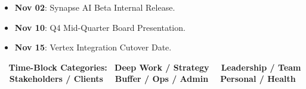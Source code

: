 \documentclass[10pt, landscape]{article}
\begin{document}
\begin{minipage}[t]{0.26\linewidth}
  \vspace{3pt}

  \begin{tcolorbox}[execbox, title={\faFolderOpen~ KEY UPCOMING MILESTONES}]
    \begin{itemize}[leftmargin=10pt, itemsep=2pt, topsep=1pt]
      \tiny
      \item \textbf{Nov 02}: Synapse AI Beta Internal Release.
      \item \textbf{Nov 10}: Q4 Mid-Quarter Board Presentation.
      \item \textbf{Nov 15}: Vertex Integration Cutover Date.
    \end{itemize}
  \end{tcolorbox}

\end{minipage}%
\hfill
\begin{minipage}[t]{0.72\linewidth}

  \begin{tcolorbox}[colback=ExecBg, colframe=ExecBorder, boxrule=0.4pt, arc=2pt, left=4pt, right=4pt, top=3pt, bottom=3pt]
    \centering\footnotesize
    \textbf{\faTags~ Time-Block Categories:} \quad
    \colorbox{DeepWorkBg}{\color{DeepWorkTxt}\textbf{\, Deep Work / Strategy \,}} \quad
    \colorbox{MeetingBg}{\color{MeetingTxt}\textbf{\, Leadership / Team \,}} \quad
    \colorbox{ClientBg}{\color{ClientTxt}\textbf{\, Stakeholders / Clients \,}} \quad
    \colorbox{AdminBg}{\color{AdminTxt}\textbf{\, Buffer / Ops / Admin \,}} \quad
    \colorbox{PersonalBg}{\color{PersonalTxt}\textbf{\, Personal / Health \,}}
  \end{tcolorbox}

  \vspace{2pt}


\end{minipage}
\end{document}

